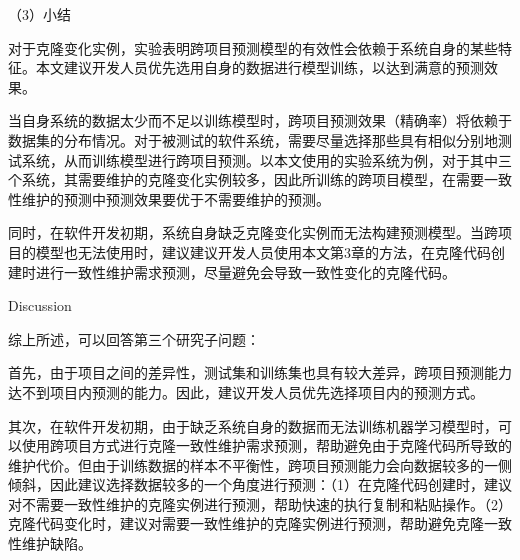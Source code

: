
（3）小结

对于克隆变化实例，实验表明跨项目预测模型的有效性会依赖于系统自身的某些特征。本文建议开发人员优先选用自身的数据进行模型训练，以达到满意的预测效果。

当自身系统的数据太少而不足以训练模型时，跨项目预测效果（精确率）将依赖于数据集的分布情况。对于被测试的软件系统，需要尽量选择那些具有相似分别地测试系统，从而训练模型进行跨项目预测。以本文使用的实验系统为例，对于其中三个系统，其需要维护的克隆变化实例较多，因此所训练的跨项目模型，在需要一致性维护的预测中预测效果要优于不需要维护的预测。

同时，在软件开发初期，系统自身缺乏克隆变化实例而无法构建预测模型。当跨项目的模型也无法使用时，建议建议开发人员使用本文第3章的方法，在克隆代码创建时进行一致性维护需求预测，尽量避免会导致一致性变化的克隆代码。

{Discussion}

综上所述，可以回答第三个研究子问题：

首先，由于项目之间的差异性，测试集和训练集也具有较大差异，跨项目预测能力达不到项目内预测的能力。因此，建议开发人员优先选择项目内的预测方式。

其次，在软件开发初期，由于缺乏系统自身的数据而无法训练机器学习模型时，可以使用跨项目方式进行克隆一致性维护需求预测，帮助避免由于克隆代码所导致的维护代价。但由于训练数据的样本不平衡性，跨项目预测能力会向数据较多的一侧倾斜，因此建议选择数据较多的一个角度进行预测：（1）在克隆代码创建时，建议对不需要一致性维护的克隆实例进行预测，帮助快速的执行复制和粘贴操作。（2）克隆代码变化时，建议对需要一致性维护的克隆实例进行预测，帮助避免克隆一致性维护缺陷。

